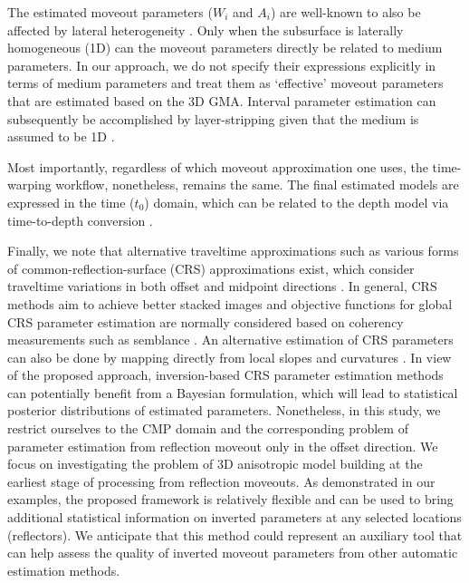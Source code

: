 The estimated moveout parameters ($W_i$ and $A_i$) are well-known to also be affected by lateral heterogeneity  \cite[]{lynnclaerbout,grechkatsvankinlathet,blias2009,zonebeyond1d}. Only when the subsurface is laterally homogeneous (1D) can the moveout parameters directly be related to medium parameters. In our approach, we do not specify their expressions explicitly in terms of medium parameters and treat them as `effective' moveout parameters that are estimated based on the 3D GMA. Interval parameter estimation can subsequently be accomplished by layer-stripping given that the medium is assumed to be 1D \cite[]{zoneinterval,korenravvetriclinic}.


Most importantly, regardless of which moveout approximation one uses, the time-warping workflow, nonetheless, remains the same. The final estimated models are expressed in the time ($t_0$) domain, which can be related to the depth model via time-to-depth conversion \cite[]{ct2d,lt2d,t2dweak}.

Finally, we note that alternative traveltime approximations such as various forms of common-reflection-surface (CRS) approximations exist, which consider traveltime variations in both offset and midpoint directions \cite[e.g.,][]{crs}. In general, CRS methods aim to achieve better stacked images and objective functions for global CRS parameter estimation are normally considered based on coherency measurements such as semblance \cite[e.g.,][]{crsdifferential,crssa,crsvti}. An alternative estimation of CRS parameters can also be done by mapping directly from local slopes and curvatures \cite[]{crsslope,crsnorway}. In view of the proposed approach, inversion-based CRS parameter estimation methods can potentially benefit from a Bayesian formulation, which will lead to statistical posterior distributions of estimated parameters. Nonetheless, in this study, we restrict ourselves to the CMP domain and the corresponding problem of parameter estimation from reflection moveout only in the offset direction. We focus on investigating the problem of 3D anisotropic model building at the earliest stage of processing from reflection moveouts. As demonstrated in our examples, the proposed framework is relatively flexible and can be used to bring additional statistical information on inverted parameters at any selected locations (reflectors). We anticipate that this method could represent an auxiliary tool that can help assess the quality of inverted moveout parameters from other automatic estimation methods.


